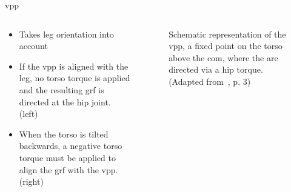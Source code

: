 \begin{frame}{\acrfull{vpp}}%
    \begin{columns}[T,onlytextwidth]%
        \begin{column}[T]{0.48\textwidth}%
            \begin{itemize}
                \item Takes leg orientation into account %
                \item If the \acrshort{vpp} is aligned with the leg, no torso torque is applied and the resulting \acrfull{grf} is directed at the hip joint. (left)
                \item When the torso is tilted backwards, a negative torso torque must be applied to align the \acrshort{grf} with the \acrshort{vpp}. (right) %
            \end{itemize}%
        \end{column}%
        \begin{column}[T]{0.48\textwidth}%
            \begin{figure}[htb]%
                \centering%
                \caption{Schematic representation of the \acrshort{vpp}, a fixed point on the torso above the \acrshort{com}, where the  are directed via a hip torque. (Adapted from~\cite{Maus2010}, p. 3)}%
                \label{fig:virtual-pivot-point}%
            \end{figure}%
        \end{column}%
    \end{columns}%
\end{frame}%
%
%
% 
%
%